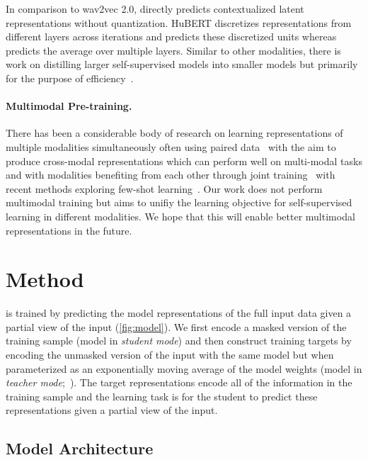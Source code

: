 \documentclass[nohyperref]{article}
\theoremstyle{plain}
\theoremstyle{definition}
\theoremstyle{remark}
\begin{document}
In comparison to wav2vec 2.0, \name{} directly predicts contextualized latent representations without quantization. 
HuBERT discretizes representations from different layers across iterations and predicts these discretized units whereas \name{} predicts the average over multiple layers.
Similar to other modalities, there is work on distilling larger self-supervised models into smaller models but primarily for the purpose of efficiency~\citep{chang2021distilhubert}.


\paragraph{Multimodal Pre-training.}
There has been a considerable body of research on learning representations of multiple modalities simultaneously often using paired data~\citep{aytar2017see,radford2021learning,wang2021vlmo,singh2021flava} with the aim to produce cross-modal representations which can perform well on multi-modal tasks and with modalities benefiting from each other through joint training~\citep{alayrac2020selfsupervised,akbari2021vatt} with recent methods exploring few-shot learning~\citep{tsimpoukelli2021multimodal}.
Our work does not perform multimodal training but aims to unifiy the learning objective for self-supervised learning in different modalities. 
We hope that this will enable better multimodal representations in the future.



\section{Method}

\name{} is trained by predicting the model representations of the full input data given a partial view of the input (\autoref{fig:model}).
We first encode a masked version of the training sample (model in \emph{student mode}) and then construct training targets by encoding the unmasked version of the input with the same model but when parameterized as an exponentially moving average of the model weights (model in \emph{teacher mode};~\citealt{grill2020byol,caron2021dino}).
The target representations encode all of the information in the training sample and the learning task is for the student to predict these representations given a partial view of the input.


\subsection{Model Architecture}
\end{document}
